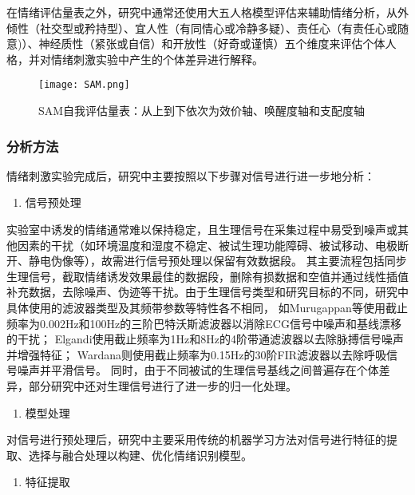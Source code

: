 在情绪评估量表之外，研究中通常还使用大五人格模型评估来辅助情绪分析\cite{AMIGOS2017}，从外倾性（社交型或矜持型）、宜人性（有同情心或冷静多疑）、责任心（有责任心或随意)）、神经质性（紧张或自信）和开放性（好奇或谨慎）五个维度来评估个体人格，并对情绪刺激实验中产生的个体差异进行解释。
\begin{figure}[htbp]
    \centering
    \texttt{[image: SAM.png]}
    \caption[SAM自我评估量表]{SAM自我评估量表：从上到下依次为效价轴、唤醒度轴和支配度轴}{\label{fig:SAM}}
\end{figure}

\subsubsection{分析方法}

情绪刺激实验完成后，研究中主要按照以下步骤对信号进行进一步地分析：

\begin{enumerate}[\hspace{1.2em}1.]    
    \item 信号预处理
\end{enumerate}

实验室中诱发的情绪通常难以保持稳定，且生理信号在采集过程中易受到噪声或其他因素的干扰（如环境温度和湿度不稳定、被试生理功能障碍、被试移动、电极断开、静电伪像等），故需进行信号预处理以保留有效数据段。
其主要流程包括同步生理信号，截取情绪诱发效果最佳的数据段，删除有损数据和空值并通过线性插值补充数据，去除噪声、伪迹等干扰。由于生理信号类型和研究目标的不同，研究中具体使用的滤波器类型及其频带参数等特性各不相同，
如Murugappan等\cite{Murugappan2013}使用截止频率为0.002Hz和100Hz的三阶巴特沃斯滤波器以消除ECG信号中噪声和基线漂移的干扰；
Elgandi\cite{Elgendi2012}使用截止频率为1Hz和8Hz的4阶带通滤波器以去除脉搏信号噪声并增强特征；
Wardana\cite{Wardana2017}则使用截止频率为0.15Hz的30阶FIR滤波器以去除呼吸信号噪声并平滑信号。
同时，由于不同被试的生理信号基线之间普遍存在个体差异，部分研究中还对生理信号进行了进一步的归一化处理\cite{Mandryk2007}。

\begin{enumerate}[\hspace{1.2em}2.]    
    \item 模型处理
\end{enumerate}

对信号进行预处理后，研究中主要采用传统的机器学习方法对信号进行特征的提取、选择与融合处理以构建、优化情绪识别模型。

\begin{enumerate}[\qquad(1)]
    \item 特征提取
\end{enumerate}

